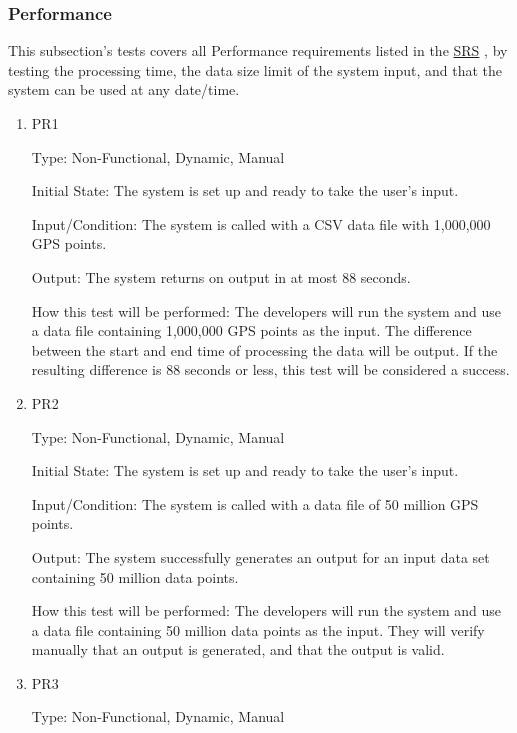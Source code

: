\documentclass[12pt, titlepage]{article}
\begin{document}
\subsubsection{Performance}
This subsection's tests covers all Performance requirements listed in the \href{https://github.com/paezha/PyERT-BLACK/blob/main/docs/SRS/SRS.pdf}{SRS} \citep{SRS}, by testing the processing time, the data size limit of the system input, and that the system can be used at any date/time. 

\begin{enumerate}

\item{PR1\\}\label{PR1}

Type: Non-Functional, Dynamic, Manual
					
Initial State: 
The system is set up and ready to take the user's input.

Input/Condition: 
The system is called with a CSV data file with 1,000,000 GPS points.

Output: 
The system returns on output in at most 88 seconds. 

How this test will be performed:
The developers will run the system and use a data file containing 1,000,000 GPS points as the input. The difference between the start and end time of processing the data will be output. If the resulting difference is 88 seconds or less, this test will be considered a success.  
\\
\item{PR2\\}\label{PR2}

Type: Non-Functional, Dynamic, Manual
					
Initial State: 
The system is set up and ready to take the user's input.

Input/Condition: 
The system is called with a data file of 50 million GPS points.

Output: 
The system successfully generates an output for an input data set containing 50 million data points.

How this test will be performed: The developers will run the system and use a data file containing 50 million data points as the input. They will verify manually that an output is generated, and that the output is valid.
\\
\item{PR3\\}\label{PR3}

Type: Non-Functional, Dynamic, Manual
					

\end{enumerate}
\end{document}

